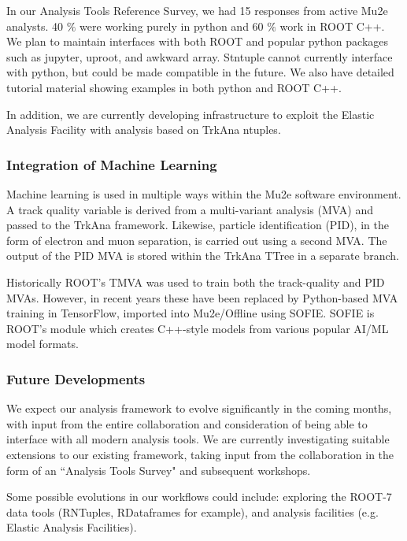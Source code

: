 In our Analysis Tools Reference Survey, we had 15 responses from active Mu2e analysts. 40 $\%$ were working purely in python and 60 $\%$ work in ROOT C++. We plan to maintain interfaces with both ROOT and popular python packages such as jupyter, uproot, and awkward array. Stntuple cannot currently interface with python, but could be made compatible in the future. We also have detailed tutorial material showing examples in both python and ROOT C++.

In addition, we are currently developing infrastructure to exploit the Elastic Analysis Facility with analysis based on TrkAna ntuples.

\subsubsection{Integration of Machine Learning}

Machine learning is used in multiple ways within the Mu2e software environment. A track quality variable is derived from a multi-variant analysis (MVA) \cite{Edmonds:2021lzd} and passed to the TrkAna framework. Likewise, particle identification (PID), in the form of electron and muon separation, is carried out using a second MVA. The output of the PID MVA is stored within the TrkAna TTree in a separate branch.


Historically ROOT's TMVA was used to train both the track-quality and PID MVAs. However, in recent years these have been replaced by Python-based MVA training in TensorFlow, imported into Mu2e/Offline using SOFIE. SOFIE is ROOT’s module which creates C++-style models from various popular AI/ML model formats.

\subsubsection{Future Developments}

We expect our analysis framework to evolve significantly in the coming months, with input from the entire collaboration and consideration of being able to interface with all modern analysis tools. We are currently investigating suitable extensions to our existing framework, taking input from the collaboration in the form of an ``Analysis Tools Survey" and subsequent workshops.

Some possible evolutions in our workflows could include: exploring the ROOT-7 data tools (RNTuples, RDataframes for example), and analysis facilities (e.g. Elastic Analysis Facilities).






